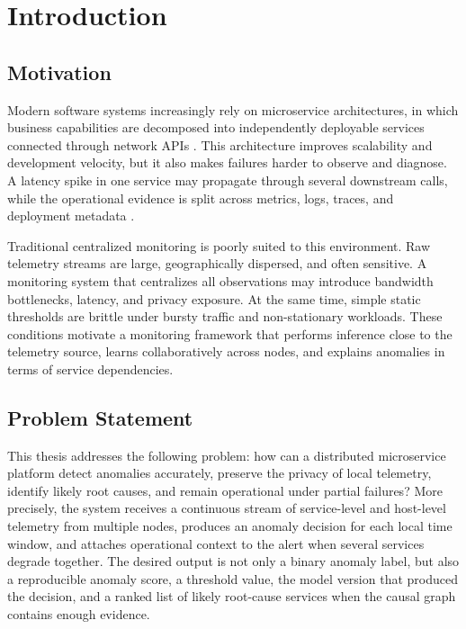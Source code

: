 \chapter{Introduction}
\label{ch:introduction}

\section{Motivation}
\label{sec:motivation}

Modern software systems increasingly rely on microservice architectures, in
which business capabilities are decomposed into independently deployable
services connected through network APIs \cite{newman2015building,
dragoni2017microservices}. This architecture improves scalability and
development velocity, but it also makes failures harder to observe and diagnose.
A latency spike in one service may propagate through several downstream calls,
while the operational evidence is split across metrics, logs, traces, and
deployment metadata \cite{sigelman2010dapper, lin2018aiops}.

Traditional centralized monitoring is poorly suited to this environment. Raw
telemetry streams are large, geographically dispersed, and often sensitive. A
monitoring system that centralizes all observations may introduce bandwidth
bottlenecks, latency, and privacy exposure. At the same time, simple static
thresholds are brittle under bursty traffic and non-stationary workloads. These
conditions motivate a monitoring framework that performs inference close to the
telemetry source, learns collaboratively across nodes, and explains anomalies in
terms of service dependencies.

\section{Problem Statement}
\label{sec:problem_statement}

This thesis addresses the following problem: how can a distributed microservice
platform detect anomalies accurately, preserve the privacy of local telemetry,
identify likely root causes, and remain operational under partial failures?
More precisely, the system receives a continuous stream of service-level and
host-level telemetry from multiple nodes, produces an anomaly decision for each
local time window, and attaches operational context to the alert when several
services degrade together. The desired output is not only a binary anomaly
label, but also a reproducible anomaly score, a threshold value, the model
version that produced the decision, and a ranked list of likely root-cause
services when the causal graph contains enough evidence.

